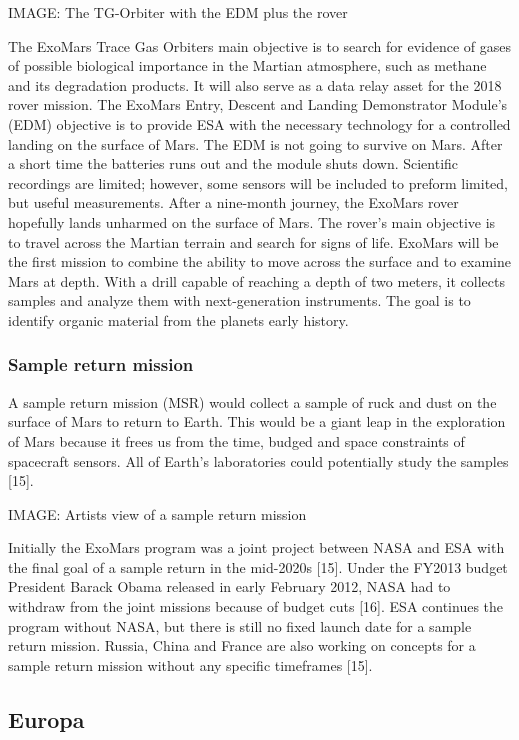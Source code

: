 IMAGE: The TG-Orbiter with the EDM plus the rover

The ExoMars Trace Gas Orbiters main objective is to search for evidence of gases of possible biological importance in the Martian atmosphere, such as methane and its degradation products.
It will also serve as a data relay asset for the 2018 rover mission.
The ExoMars Entry, Descent and Landing Demonstrator Module’s (EDM) objective is to provide ESA with the necessary technology for a controlled landing on the surface of Mars.
The EDM is not going to survive on Mars.
After a short time the batteries runs out and the module shuts down.
Scientific recordings are limited; however, some sensors will be included to preform limited, but useful measurements.
After a nine-month journey, the ExoMars rover hopefully lands unharmed on the surface of Mars.
The rover’s main objective is to travel across the Martian terrain and search for signs of life.
ExoMars will be the first mission to combine the ability to move across the surface and to examine Mars at depth.
With a drill capable of reaching a depth of two meters, it collects samples and analyze them with next-generation instruments.
The goal is to identify organic material from the planets early history.

\subsubsection*{Sample return mission}

A sample return mission (MSR) would collect a sample of ruck and dust on the surface of Mars to return to Earth.
This would be a giant leap in the exploration of Mars because it frees us from the time, budged and space constraints of spacecraft sensors.
All of Earth’s laboratories could potentially study the samples [15].
 
IMAGE: Artists view of a sample return mission

Initially the ExoMars program was a joint project between NASA and ESA with the final goal of a sample return in the mid-2020s [15].
Under the FY2013 budget President Barack Obama released in early February 2012, NASA had to withdraw from the joint missions because of budget cuts [16].
ESA continues the program without NASA, but there is still no fixed launch date for a sample return mission.
Russia, China and France are also working on concepts for a sample return mission without any specific timeframes [15].

\subsection*{Europa}
 
